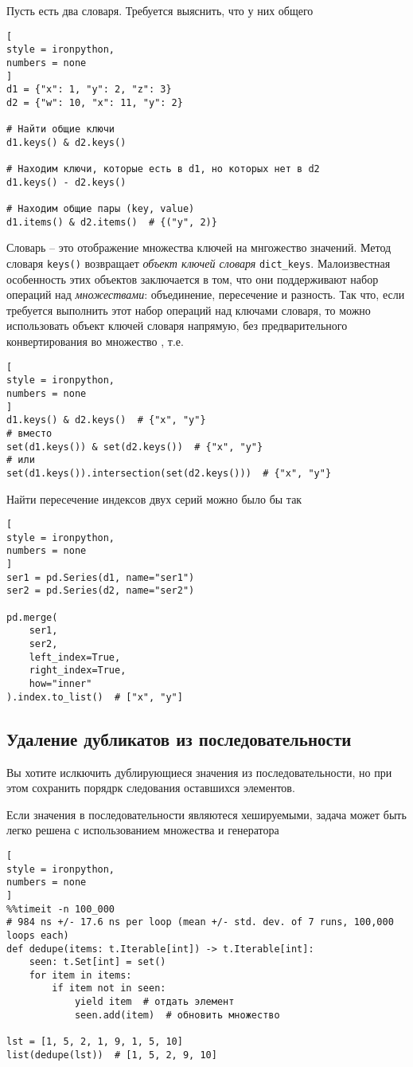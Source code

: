 \documentclass[%
	11pt,
	a4paper,
	utf8,
		]{article}
\begin{document}
Пусть есть два словаря. Требуется выяснить, что у них общего
\begin{lstlisting}[
style = ironpython,
numbers = none
]
d1 = {"x": 1, "y": 2, "z": 3}
d2 = {"w": 10, "x": 11, "y": 2}

# Найти общие ключи
d1.keys() & d2.keys()

# Находим ключи, которые есть в d1, но которых нет в d2
d1.keys() - d2.keys()

# Находим общие пары (key, value)
d1.items() & d2.items()  # {("y", 2)}
\end{lstlisting}

Словарь -- это отображение множества ключей на мнгожество значений. Метод словаря \texttt{keys()} возвращает \emph{объект ключей словаря} \texttt{dict\_keys}. Малоизвестная особенность этих объектов заключается в том, что они поддерживают набор операций над \emph{множествами}: объединение, пересечение и разность. Так что, если требуется выполнить этот набор операций над ключами словаря, то можно использовать объект ключей словаря напрямую, без предварительного конвертирования во множество \cite[]{beazley:python_cookbook-2019}, т.е.
\begin{lstlisting}[
style = ironpython,
numbers = none
]
d1.keys() & d2.keys()  # {"x", "y"}
# вместо
set(d1.keys()) & set(d2.keys())  # {"x", "y"}
# или
set(d1.keys()).intersection(set(d2.keys()))  # {"x", "y"}
\end{lstlisting}

Найти пересечение индексов двух серий можно было бы так
\begin{lstlisting}[
style = ironpython,
numbers = none
]
ser1 = pd.Series(d1, name="ser1")
ser2 = pd.Series(d2, name="ser2")

pd.merge(
    ser1,
    ser2,
    left_index=True,
    right_index=True,
    how="inner"
).index.to_list()  # ["x", "y"]
\end{lstlisting}

\subsection{Удаление дубликатов из последовательности}

Вы хотите ислкючить дублирующиеся значения из последовательности, но при этом сохранить порядрк следования оставшихся элементов.

Если значения в последовательности являютеся хешируемыми, задача может быть легко решена с использованием множества и генератора
\begin{lstlisting}[
style = ironpython,
numbers = none
]
%%timeit -n 100_000
# 984 ns +/- 17.6 ns per loop (mean +/- std. dev. of 7 runs, 100,000 loops each)
def dedupe(items: t.Iterable[int]) -> t.Iterable[int]:
    seen: t.Set[int] = set()
    for item in items:
        if item not in seen:
            yield item  # отдать элемент
            seen.add(item)  # обновить множество
            
lst = [1, 5, 2, 1, 9, 1, 5, 10]
list(dedupe(lst))  # [1, 5, 2, 9, 10]
\end{lstlisting}
\end{document}
